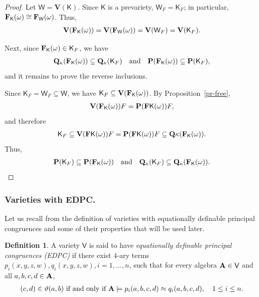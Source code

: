 \documentclass[submission,copyright,creativecommons]{eptcs}
\theoremstyle{definition}
\newtheorem{definition}{Definition}
\newcommand{\alg}[1]{{{\textbf{\upshape #1}}}}
\newcommand{\VV}{\mathbf{V}}
\newcommand{\QQ}{\mathbf{Q}}
\newcommand{\PR}{\mathbf{P}}
\newcommand{\vv}[1]{\mathsf {#1}}
\newcommand{\Def}[1]{\textit{#1}}
\newcommand{\app}{\approx}
\newcommand{\kk}{\kappa}
\begin{document}
\begin{proof}
	Let $\vv W = \VV(\vv K)$. Since $\vv K$ is a prevariety, $\vv W_F = \vv K_F$; in particular, $\alg F_\vv K(\omega) \cong \alg F_\vv W(\omega)$. Thus,
	\begin{align*}
		\VV(\alg F_\vv K(\omega)) = \VV(\alg F_\vv W(\omega)) = \VV(\vv W_F) = \VV(\vv K_F).
	\end{align*}
	
	Next, since $\alg F_\vv K(\omega) \in \vv K_F$, we have
	\begin{align*}
		\QQ_\kk(\alg F_\vv K(\omega)) \subseteq \QQ_\kk(\vv K_F) \quad \text{and} \quad
		\PR(\alg F_\vv K(\omega)) \subseteq \PR(\vv K_F),
	\end{align*}
	and it remains to prove the reverse inclusions.
	
	Since $\vv K_F = \vv W_F \subseteq \vv W$, we have $\vv K_F \subseteq \VV(\alg F_\vv K(\omega))$. By Proposition~\ref{pr-free},
	\begin{align*}
		\VV(\alg F_\vv K(\omega))F = \PR(\alg F\vv K(\omega))F,
	\end{align*}
	and therefore
	\begin{align*}
		\vv K_F \subseteq \VV(\alg F\vv K(\omega))F = \PR(\alg F\vv K(\omega))F \subseteq \QQ\kk(\alg F_\vv K(\omega)).
	\end{align*}
	Thus,
	\begin{align*}
		\PR(\vv K_F) \subseteq \PR(\alg F_\vv K(\omega)) \quad \text{and} \quad
		\QQ_\kk(\vv K_F) \subseteq \QQ_\kk(\alg F_\vv K(\omega)).
	\end{align*}
\end{proof}


\subsubsection*{Varieties with EDPC.}

Let us recall from \cite{BlkPgz1} the definition of varieties with equationally definable principal congruences and some of their properties that will be used later.

\begin{definition}
	A variety $\vv V$ is said to have \Def{equationally definable principal congruences (EDPC)} if there exist $4$-ary terms
	$p_i(x,y,z,w), q_i(x,y,z,w), i = 1,\dots,n$,
	such that for every algebra $\alg A \in \vv V$ and all $a,b,c,d \in \alg A$,
	\begin{align}
		(c,d) \in \vartheta(a,b) \text{ if and only if } \alg A \models p_i(a,b,c,d) \app q_i(a,b,c,d), \quad 1 \leq i \leq n.
		\label{def-EDPC}
	\end{align}
\end{definition}
\end{document}
